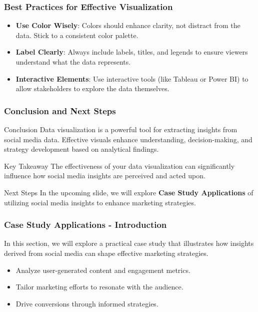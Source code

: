 \documentclass{beamer}
\begin{document}
\begin{frame}[fragile]
    \frametitle{Best Practices for Effective Visualization}
    \begin{itemize}
        \item \textbf{Use Color Wisely}: Colors should enhance clarity, not distract from the data. Stick to a consistent color palette.
        \item \textbf{Label Clearly}: Always include labels, titles, and legends to ensure viewers understand what the data represents.
        \item \textbf{Interactive Elements}: Use interactive tools (like Tableau or Power BI) to allow stakeholders to explore the data themselves.
    \end{itemize}
\end{frame}

\begin{frame}[fragile]
    \frametitle{Conclusion and Next Steps}
    \begin{block}{Conclusion}
        Data visualization is a powerful tool for extracting insights from social media data. Effective visuals enhance understanding, decision-making, and strategy development based on analytical findings.
    \end{block}
    \begin{block}{Key Takeaway}
        The effectiveness of your data visualization can significantly influence how social media insights are perceived and acted upon.
    \end{block}
    \begin{block}{Next Steps}
        In the upcoming slide, we will explore \textbf{Case Study Applications} of utilizing social media insights to enhance marketing strategies.
    \end{block}
\end{frame}

\begin{frame}[fragile]
    \frametitle{Case Study Applications - Introduction}
    In this section, we will explore a practical case study that illustrates how insights derived from social media can shape effective marketing strategies. 
    \begin{itemize}
        \item Analyze user-generated content and engagement metrics. 
        \item Tailor marketing efforts to resonate with the audience.
        \item Drive conversions through informed strategies.
    \end{itemize}
\end{frame}
\end{document}
